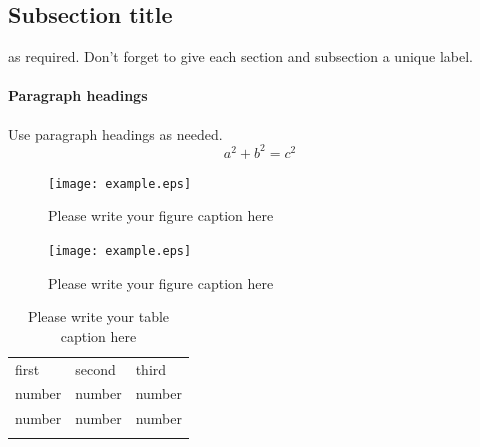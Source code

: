
\clearpage



\subsection{Subsection title}
\label{sec:2}
as required. Don't forget to give each section
and subsection a unique label.
\paragraph{Paragraph headings} Use paragraph headings as needed.
\begin{equation}
a^2+b^2=c^2
\end{equation}

\begin{figure}
  \texttt{[image: example.eps]}
\caption{Please write your figure caption here}
\label{fig:1}       %
\end{figure}
%
\begin{figure}
  \texttt{[image: example.eps]}
\caption{Please write your figure caption here}
\label{fig:2}       %
\end{figure}
%
\begin{table}
\caption{Please write your table caption here}
\label{tab:1}       %
\begin{tabular}{lll}
\hline\noalign{\smallskip}
first & second & third  \\
\noalign{\smallskip}\hline\noalign{\smallskip}
number & number & number \\
number & number & number \\
\noalign{\smallskip}\hline
\end{tabular}
\end{table}




